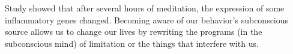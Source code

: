 \documentclass[12pt, a4paper]{article}
\begin{document}
Study showed that after several hours of meditation, the expression of some inflammatory genes changed\citep{Gustafson2017}.
Becoming aware of our behavior's subconscious source allows us to change our lives by rewriting the programs (in the subconscious mind) of limitation or the things that interfere with us.
\end{document}
